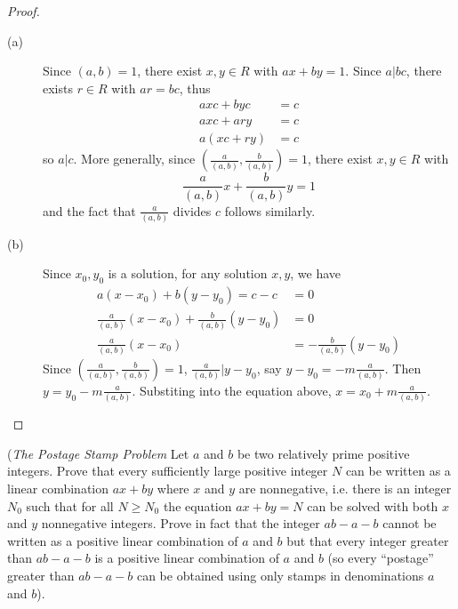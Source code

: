 \documentclass[12pt,leqno]{book}
\numberwithin{equation}{section}
\newcommand{\question}[2] {\vspace{.25in}\noindent\fbox{#1} #2 \vspace{.10in}}
\theoremstyle{definition}
\begin{document}
\begin{proof}\indent
 \begin{description}
  \item [(a)] Since $(a,b)=1$, there exist $x,y\in R$ with $ax+by=1$. Since $a|bc$, there exists $r\in R$ with $ar=bc$, thus \begin{align*}axc+byc&=c\\axc+ary&=c\\a(xc+ry)&=c\end{align*} so $a|c$. More generally, since $\left(\frac{a}{(a,b)},\frac{b}{(a,b)}\right)=1$, there exist $x,y\in R$ with \[\frac{a}{(a,b)}x+\frac{b}{(a,b)}y=1\] and the fact that $\frac{a}{(a,b)}$ divides $c$ follows similarly.
  \item [(b)] Since $x_0,y_0$ is a solution, for any solution $x,y$, we have \begin{align*}a(x-x_0)+b(y-y_0)=c-c&=0\\\frac{a}{(a,b)}(x-x_0)+\frac{b}{(a,b)}(y-y_0)&=0\\\frac{a}{(a,b)}(x-x_0)&=-\frac{b}{(a,b)}(y-y_0)\end{align*} Since $\left(\frac{a}{(a,b)},\frac{b}{(a,b)}\right)=1$, $\frac{a}{(a,b)}|y-y_0$, say $y-y_0=-m\frac{a}{(a,b)}$. Then $y=y_0-m\frac{a}{(a,b)}$. Substiting into the equation above, $x=x_0+m\frac{a}{(a,b)}$.\qedhere
 \end{description}

\end{proof}

\question{6}{(\textit{The Postage Stamp Problem} Let $a$ and $b$ be two relatively prime positive integers. Prove that every sufficiently large positive integer $N$ can be written as a linear combination $ax+by$ where $x$ and $y$ are nonnegative, i.e. there is an integer $N_0$ such that for all $N\geq N_0$ the equation $ax+by=N$ can be solved with both $x$ and $y$ nonnegative integers. Prove in fact that the integer $ab-a-b$ cannot be written as a positive linear combination of $a$ and $b$ but that every integer greater than $ab-a-b$ is a positive linear combination of $a$ and $b$ (so every ``postage'' greater than $ab-a-b$ can be obtained using only stamps in denominations $a$ and $b$).}
\end{document}

